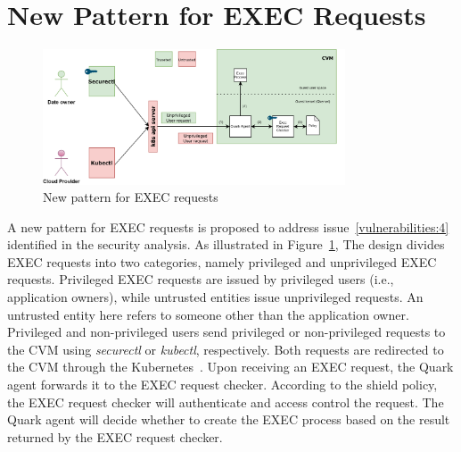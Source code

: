 \section{New Pattern for EXEC Requests}
\label{sec:design_EXEC_Requests}
\begin{figure}[!htb]
    \centering
    \includegraphics[width=0.8\textwidth]{images/new_pattern_of_exec.png}
    \caption[New pattern for EXEC requests]{New pattern for EXEC requests}
    \label{fig:new_pattern_of_exec}
\end{figure}


A new pattern for EXEC requests is proposed to address issue~\ref{vulnerabilities:4} identified in the security analysis. As illustrated in Figure~\ref{fig:new_pattern_of_exec}, The design divides EXEC requests into two categories, namely privileged and unprivileged EXEC requests. 
Privileged EXEC requests are issued by privileged users (i.e., application owners), while untrusted entities issue unprivileged requests. An untrusted entity here refers to someone other than the application owner. Privileged and non-privileged users send privileged or non-privileged requests to the \acrshort{CVM} using \emph{securectl} or \emph{kubectl}, 
respectively. Both requests are redirected to the \acrshort{CVM} through the Kubernetes~\cite*{k8s}. Upon receiving an EXEC request, the Quark agent forwards it to the EXEC request checker. According to the shield policy, the EXEC request checker will authenticate and access control the request. The Quark agent will decide whether to create the 
EXEC process based on the result returned by the EXEC request checker.


